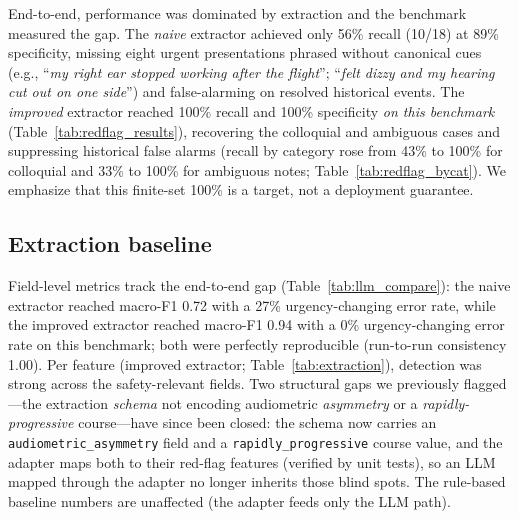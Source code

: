 \documentclass[11pt]{article}
\begin{document}
End-to-end, performance was dominated by extraction and the benchmark measured the gap. The \emph{naive} extractor achieved only 56\% recall (10/18) at 89\% specificity, missing eight urgent presentations phrased without canonical cues (e.g., ``\emph{my right ear stopped working after the flight}''; ``\emph{felt dizzy and my hearing cut out on one side}'') and false-alarming on resolved historical events. The \emph{improved} extractor reached 100\% recall and 100\% specificity \emph{on this benchmark} (Table~\ref{tab:redflag_results}), recovering the colloquial and ambiguous cases and suppressing historical false alarms (recall by category rose from 43\% to 100\% for colloquial and 33\% to 100\% for ambiguous notes; Table~\ref{tab:redflag_bycat}). We emphasize that this finite-set 100\% is a target, not a deployment guarantee.




\subsection{Extraction baseline}
Field-level metrics track the end-to-end gap (Table~\ref{tab:llm_compare}): the naive extractor reached macro-F1 0.72 with a 27\% urgency-changing error rate, while the improved extractor reached macro-F1 0.94 with a 0\% urgency-changing error rate on this benchmark; both were perfectly reproducible (run-to-run consistency 1.00). Per feature (improved extractor; Table~\ref{tab:extraction}), detection was strong across the safety-relevant fields. Two structural gaps we previously flagged---the extraction \emph{schema} not encoding audiometric \emph{asymmetry} or a \emph{rapidly-progressive} course---have since been closed: the schema now carries an \texttt{audiometric\_asymmetry} field and a \texttt{rapidly\_progressive} course value, and the adapter maps both to their red-flag features (verified by unit tests), so an LLM mapped through the adapter no longer inherits those blind spots. The rule-based baseline numbers are unaffected (the adapter feeds only the LLM path).


\end{document}
